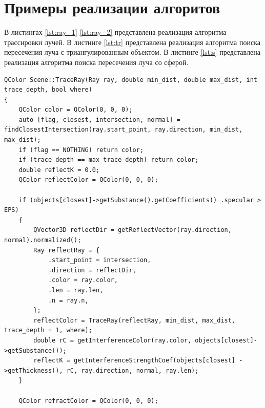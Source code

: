 \clearpage

\section{Примеры реализации алгоритов}

В листингах \ref{lst:ray_1}-\ref{lst:ray_2} представлена реализация алгоритма трассировки лучей. В листинге \ref{lst:tr} представлена реализация алгоритма поиска пересечения луча с триангулированным объектом. В листинге \ref{lst:s} представлена реализация алгоритма поиска пересечения луча со сферой.

\begin{center}
\captionsetup{justification=raggedright,singlelinecheck=off}
\begin{lstlisting}[label=lst:ray_1,caption=Трассировка лучей (часть 1),basicstyle=\ttfamily\footnotesize]
QColor Scene::TraceRay(Ray ray, double min_dist, double max_dist, int trace_depth, bool where)
{
    QColor color = QColor(0, 0, 0);
    auto [flag, closest, intersection, normal] = findClosestIntersection(ray.start_point, ray.direction, min_dist, max_dist);
    if (flag == NOTHING) return color;
    if (trace_depth == max_trace_depth) return color;
    double reflectK = 0.0;
    QColor reflectColor = QColor(0, 0, 0);

    if (objects[closest]->getSubstance().getCoefficients() .specular > EPS)
    {
        QVector3D reflectDir = getReflectVector(ray.direction, normal).normalized();
        Ray reflectRay = {
            .start_point = intersection,
            .direction = reflectDir,
            .color = ray.color,
            .len = ray.len,
            .n = ray.n,
        };
        reflectColor = TraceRay(reflectRay, min_dist, max_dist, trace_depth + 1, where);
        double rC = getInterferenceColor(ray.color, objects[closest]->getSubstance());
        reflectK = getInterferenceStrengthCoef(objects[closest] ->getThickness(), rC, ray.direction, normal, ray.len);
    }

    QColor refractColor = QColor(0, 0, 0);
\end{lstlisting}
\end{center}

\clearpage


